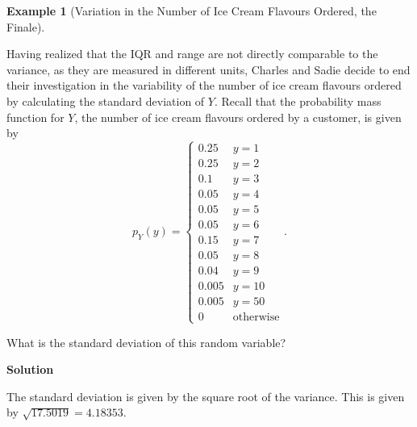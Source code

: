 \documentclass[
  letterpaper,
  DIV=11,
  numbers=noendperiod]{scrreprt}
\theoremstyle{definition}
\theoremstyle{definition}
\newtheorem{example}{Example}[chapter]
\theoremstyle{definition}
\theoremstyle{remark}
\begin{document}
\begin{example}[Variation in the Number of Ice Cream Flavours Ordered,
the Finale]\protect\hypertarget{exm-sd}{}\label{exm-sd}

Having realized that the IQR and range are not directly comparable to
the variance, as they are measured in different units, Charles and Sadie
decide to end their investigation in the variability of the number of
ice cream flavours ordered by calculating the standard deviation of
\(Y\). Recall that the probability mass function for \(Y\), the number
of ice cream flavours ordered by a customer, is given by \[
p_Y(y) = \begin{cases} 
0.25 & y = 1 \\
0.25 & y = 2 \\
0.1 & y = 3 \\
0.05 & y = 4 \\
0.05 & y = 5 \\
0.05 & y = 6 \\
0.15 & y = 7 \\
0.05 & y = 8 \\
0.04 & y = 9 \\
0.005 & y = 10 \\ 
0.005 & y = 50 \\
0 & \text{otherwise}
\end{cases}.
\]

What is the standard deviation of this random variable?

\begin{tcolorbox}[enhanced jigsaw, colback=white, colframe=quarto-callout-color-frame, arc=.35mm, leftrule=.75mm, rightrule=.15mm, opacityback=0, breakable, bottomrule=.15mm, left=2mm, toprule=.15mm]

\vspace{-3mm}\textbf{Solution}\vspace{3mm}

The standard deviation is given by the square root of the variance. This
is given by \(\sqrt{17.5019} = 4.18353\).

\end{tcolorbox}

\end{example}
\end{document}
